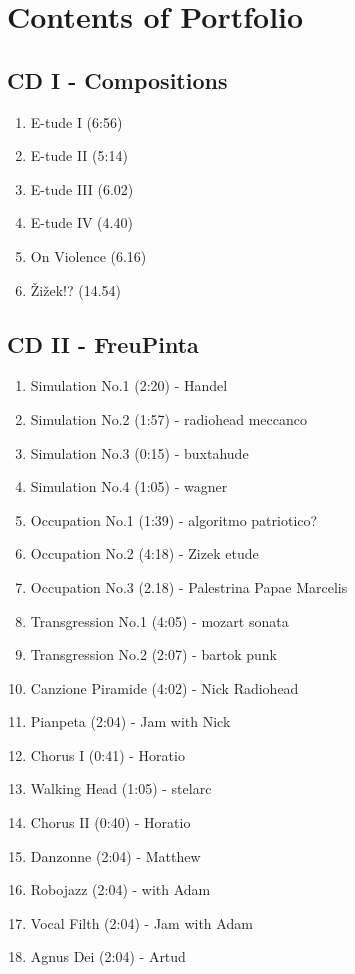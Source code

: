 \chapter*{Contents of Portfolio}
\hypertarget{portfolio}{}

\section*{CD I - Compositions}

\begin{enumerate}
\item E-tude I (6:56)
\item E-tude II (5:14)
\item E-tude III (6.02)
\item E-tude IV (4.40)
\item On Violence (6.16)
\item \v{Z}i\v{z}ek!? (14.54)
\end{enumerate}

\section*{CD II - FreuPinta}

\begin{enumerate}
\item Simulation No.1 (2:20) - Handel
\item Simulation No.2 (1:57) - radiohead meccanco
\item Simulation No.3 (0:15) - buxtahude
\item Simulation No.4 (1:05) - wagner
\item Occupation No.1 (1:39) - algoritmo patriotico?
\item Occupation No.2 (4:18) - Zizek etude
\item Occupation No.3 (2.18) - Palestrina Papae Marcelis
\item Transgression No.1 (4:05) - mozart sonata
\item Transgression No.2 (2:07) - bartok punk
\item Canzione Piramide (4:02) - Nick Radiohead
\item Pianpeta (2:04) - Jam with Nick
\item Chorus I (0:41) - Horatio
\item Walking Head (1:05) - stelarc
\item Chorus II (0:40) - Horatio
\item Danzonne (2:04) - Matthew
\item Robojazz (2:04) - with Adam
\item Vocal Filth (2:04) - Jam with Adam
\item Agnus Dei (2:04) - Artud

\end{enumerate}

